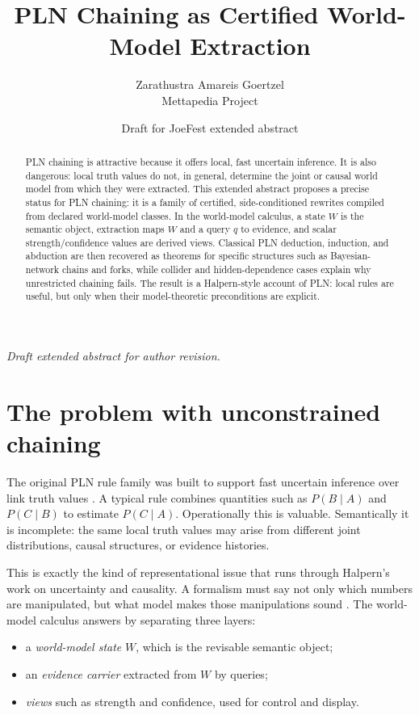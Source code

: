 \documentclass[11pt]{article}
\title{PLN Chaining as Certified World-Model Extraction}
\author{Zarathustra Amareis Goertzel\\\small Mettapedia Project}
\date{Draft for JoeFest extended abstract}
\newcommand{\draftnote}{\noindent\textit{Draft extended abstract for author revision.}}
\begin{document}
\maketitle
\draftnote

\begin{abstract}
PLN chaining is attractive because it offers local, fast uncertain inference. It is also dangerous: local truth values do not, in general, determine the joint or causal world model from which they were extracted. This extended abstract proposes a precise status for PLN chaining: it is a family of certified, side-conditioned rewrites compiled from declared world-model classes. In the world-model calculus, a state $W$ is the semantic object, extraction maps $W$ and a query $q$ to evidence, and scalar strength/confidence values are derived views. Classical PLN deduction, induction, and abduction are then recovered as theorems for specific structures such as Bayesian-network chains and forks, while collider and hidden-dependence cases explain why unrestricted chaining fails. The result is a Halpern-style account of PLN: local rules are useful, but only when their model-theoretic preconditions are explicit.
\end{abstract}

\section{The problem with unconstrained chaining}

The original PLN rule family was built to support fast uncertain inference over link truth values \cite{GoertzelPLN2009}. A typical rule combines quantities such as $P(B \mid A)$ and $P(C \mid B)$ to estimate $P(C \mid A)$. Operationally this is valuable. Semantically it is incomplete: the same local truth values may arise from different joint distributions, causal structures, or evidence histories.

This is exactly the kind of representational issue that runs through Halpern's work on uncertainty and causality. A formalism must say not only which numbers are manipulated, but what model makes those manipulations sound \cite{Halpern2003,HalpernPearl2005}. The world-model calculus answers by separating three layers:
\begin{itemize}
\item a \emph{world-model state} $W$, which is the revisable semantic object;
\item an \emph{evidence carrier} extracted from $W$ by queries;
\item \emph{views} such as strength and confidence, used for control and display.
\end{itemize}
\end{document}

